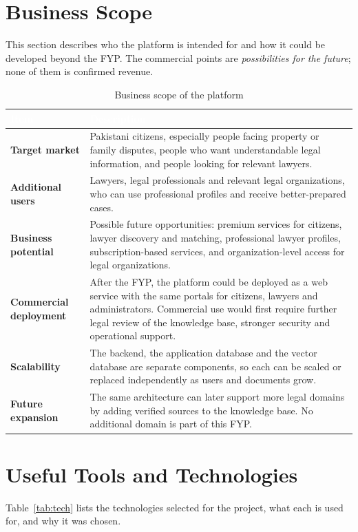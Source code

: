 \documentclass[12pt,a4paper]{report}
\newcommand{\thd}[1]{\textcolor{white}{\textbf{#1}}}
\newcommand{\headrow}{\rowcolor{tablehead}}
\begin{document}
\section{Business Scope}
This section describes who the platform is intended for and how it could be developed beyond the FYP. The commercial points are \emph{possibilities for the future}; none of them is confirmed revenue.

\begin{table}[H]
\centering
\caption{Business scope of the platform}
\label{tab:business}
\begin{tabular}{|L{3.6cm}|L{10.4cm}|}
\hline
\headrow \thd{Item} & \thd{Description} \\ \hline
\textbf{Target market} & Pakistani citizens, especially people facing property or family disputes, people who want understandable legal information, and people looking for relevant lawyers. \\ \hline
{}\textbf{Additional users} & Lawyers, legal professionals and relevant legal organizations, who can use professional profiles and receive better-prepared cases. \\ \hline
\textbf{Business potential} & Possible future opportunities: premium services for citizens, lawyer discovery and matching, professional lawyer profiles, subscription-based services, and organization-level access for legal organizations. \\ \hline
{}\textbf{Commercial deployment} & After the FYP, the platform could be deployed as a web service with the same portals for citizens, lawyers and administrators. Commercial use would first require further legal review of the knowledge base, stronger security and operational support. \\ \hline
\textbf{Scalability} & The backend, the application database and the vector database are separate components, so each can be scaled or replaced independently as users and documents grow. \\ \hline
{}\textbf{Future expansion} & The same architecture can later support more legal domains by adding verified sources to the knowledge base. No additional domain is part of this FYP. \\ \hline
\end{tabular}
\end{table}

\section{Useful Tools and Technologies}
Table~\ref{tab:tech} lists the technologies selected for the project, what each is used for, and why it was chosen.
\end{document}
